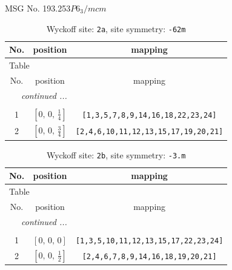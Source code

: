 \documentclass[fleqn,8pt]{jsarticle}
\begin{document}
\setcounter{MaxMatrixCols}{32}

\renewcommand{\tablename}{Table~}
\renewcommand{\figurename}{Figure~}
\begin{center}
\LARGE
MSG No. 193.253\quad$P6_{3}/mcm$
\end{center}
\renewcommand{\arraystretch}{1.2}
\begin{longtable}{ccc}
\caption{Wyckoff site: {\tt 2a}, site symmetry: {\tt -62m}}
 \\
 \hline \hline
No. & position & mapping \\ \hline \endfirsthead

\multicolumn{2}{l}{\tablename\ \thetable{}} \\
 \hline \hline
No. & position & mapping \\ \hline \endhead

 \hline \hline
\multicolumn{2}{r}{\footnotesize\it continued ...} \\ \endfoot

 \hline \hline
\multicolumn{2}{r}{} \\ \endlastfoot

1 & $\left[ 0,\, 0,\, \frac{1}{4} \right]$ & {\tt [1,3,5,7,8,9,14,16,18,22,23,24]} \\ \hline
2 & $\left[ 0,\, 0,\, \frac{3}{4} \right]$ & {\tt [2,4,6,10,11,12,13,15,17,19,20,21]} \\
\end{longtable}
\renewcommand{\arraystretch}{1.2}
\begin{longtable}{ccc}
\caption{Wyckoff site: {\tt 2b}, site symmetry: {\tt -3.m}}
 \\
 \hline \hline
No. & position & mapping \\ \hline \endfirsthead

\multicolumn{2}{l}{\tablename\ \thetable{}} \\
 \hline \hline
No. & position & mapping \\ \hline \endhead

 \hline \hline
\multicolumn{2}{r}{\footnotesize\it continued ...} \\ \endfoot

 \hline \hline
\multicolumn{2}{r}{} \\ \endlastfoot

1 & $\left[ 0,\, 0,\, 0 \right]$ & {\tt [1,3,5,10,11,12,13,15,17,22,23,24]} \\ \hline
2 & $\left[ 0,\, 0,\, \frac{1}{2} \right]$ & {\tt [2,4,6,7,8,9,14,16,18,19,20,21]} \\
\end{longtable}
\end{document}
